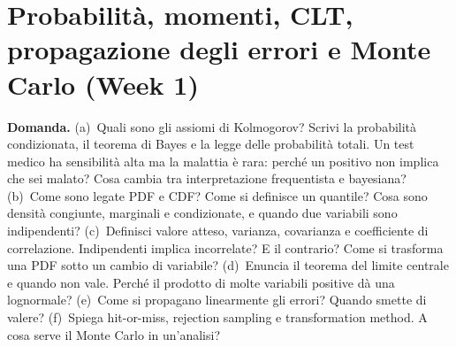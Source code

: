 \documentclass[11pt,a4paper]{article}
\newcommand{\Dom}[1]{\par\medskip\noindent\textbf{Domanda.} #1\par\nopagebreak}
\begin{document}
\clearpage
\section{Probabilit\`a, momenti, CLT, propagazione degli errori e Monte Carlo (Week 1)}

\Dom{(a)~Quali sono gli assiomi di Kolmogorov? Scrivi la probabilit\`a condizionata, il teorema di Bayes e la legge delle probabilit\`a totali. Un test medico ha sensibilit\`a alta ma la malattia \`e rara: perch\'e un positivo non implica che sei malato? Cosa cambia tra interpretazione frequentista e bayesiana?
(b)~Come sono legate PDF e CDF? Come si definisce un quantile? Cosa sono densit\`a congiunte, marginali e condizionate, e quando due variabili sono indipendenti?
(c)~Definisci valore atteso, varianza, covarianza e coefficiente di correlazione. Indipendenti implica incorrelate? E il contrario? Come si trasforma una PDF sotto un cambio di variabile?
(d)~Enuncia il teorema del limite centrale e quando non vale. Perch\'e il prodotto di molte variabili positive d\`a una lognormale?
(e)~Come si propagano linearmente gli errori? Quando smette di valere?
(f)~Spiega hit-or-miss, rejection sampling e transformation method. A cosa serve il Monte Carlo in un'analisi?}
\end{document}
